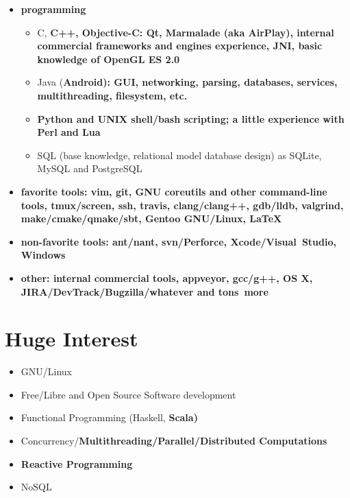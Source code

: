 \begin{itemize}

\item \bfseries programming\mdseries

    \begin{itemize}
    \item C, \bfseries C++\mdseries, Objective-C:
    Qt, Marmalade (aka AirPlay), internal commercial frameworks and engines experience,
    \bfseries JNI\mdseries, basic knowledge of OpenGL ES 2.0


    \item Java (\bfseries Android\mdseries):
    GUI, networking, parsing, databases, services, multithreading, filesystem, etc.


    \item \bfseries Python \mdseries and UNIX \bfseries shell/bash \mdseries scripting;
    a little experience with Perl and Lua

    \item SQL (base knowledge, relational model database design) as SQLite, MySQL and PostgreSQL
    \end{itemize}

\item \bfseries favorite tools\mdseries:
vim, \bfseries git\mdseries, GNU \bfseries coreutils \mdseries and other command-line tools, tmux/screen, \bfseries ssh\mdseries, travis,
clang/clang++, gdb/lldb, valgrind, make/cmake/qmake/sbt, \bfseries Gentoo GNU/Linux\mdseries, \LaTeX
\item \bfseries non-favorite tools\mdseries: ant/nant, svn/Perforce, Xcode/Visual~Studio, Windows
\item \bfseries other\mdseries: internal commercial tools, appveyor, gcc/g++, OS X, JIRA/DevTrack/Bugzilla/whatever and \bfseries tons~\mdseries more

\end{itemize}

\section{Huge Interest}
\begin{itemize}
\item GNU/Linux
\item Free/Libre and Open Source Software development
\item Functional Programming (Haskell, \bfseries Scala\mdseries)
\item Concurrency/\bfseries Multithreading\mdseries/Parallel/\bfseries Distributed \mdseries Computations
\item \bfseries Reactive \mdseries Programming
\item NoSQL
\end{itemize}


